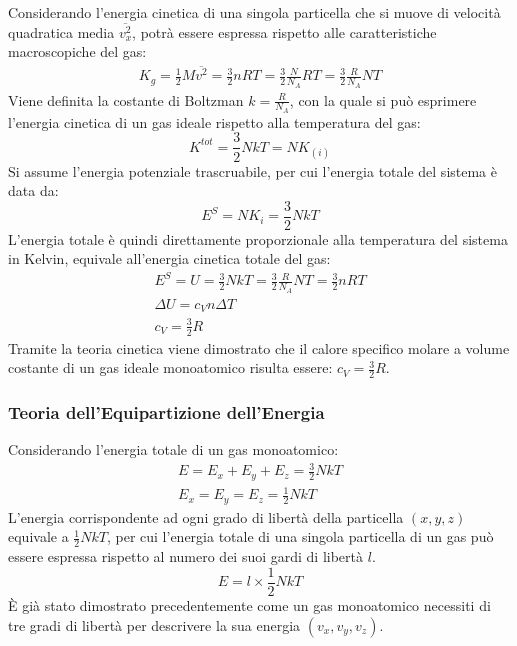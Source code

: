 \documentclass{article}
\numberwithin{equation}{subsection}
\begin{document}
Considerando l'energia cinetica di una singola particella che si muove di velocità quadratica media $\overline{v_x^2}$, potrà essere espressa rispetto alle caratteristiche 
macroscopiche del gas: 
\begin{gather*}
    K_g=\displaystyle\frac{1}{2}M\overline {v^2}=\frac{3}{2}nRT=\frac{3}{2}\frac{N}{N_A}RT=\frac{3}{2}\frac{R}{N_A}NT
\end{gather*}
Viene definita la costante di Boltzman $k=\displaystyle\frac{R}{N_A}$, 
con la quale si può esprimere l'energia cinetica di un gas ideale 
rispetto alla temperatura del gas:
\begin{equation*}
    K^{tot}=\displaystyle\frac{3}{2}NkT=NK_{(i)}
\end{equation*}
Si assume l'energia potenziale trascruabile, per cui 
l'energia totale del sistema è data da:
\begin{equation}
    E^S=NK_i=\displaystyle\frac{3}{2}NkT
\end{equation}
L'energia totale è quindi direttamente proporzionale alla 
temperatura del sistema in Kelvin, equivale all'energia cinetica totale del gas: 
\begin{gather*}
    E^S= U=\displaystyle\frac{3}{2}NkT=\frac{3}{2}\frac{R}{N_A}NT=\frac{3}{2}nRT\\
    \Delta U=c_Vn\Delta T\\
    c_V=\displaystyle\frac{3}{2}R
\end{gather*}
Tramite la teoria cinetica viene dimostrato che il calore 
specifico molare a volume costante di un gas ideale 
monoatomico risulta essere: $c_V=\displaystyle\frac{3}{2}R$.

\subsubsection{Teoria dell'Equipartizione dell'Energia}


Considerando l'energia totale di un gas monoatomico:
\begin{gather*}
    E=E_x+E_y+E_z=\displaystyle\frac{3}{2}NkT\\
    E_x=E_y=E_z=\displaystyle\frac{1}{2}NkT
\end{gather*}
L'energia corrispondente ad ogni grado di libertà della particella $(x,y,z)$ equivale a $\displaystyle\frac{1}{2}NkT$, per cui l'energia totale di una singola particella di un 
gas può essere espressa rispetto al numero dei suoi gardi di libertà $l$. 
\begin{equation*}
    E=l\times\frac{1}{2}NkT
\end{equation*} 
\`{E} già stato dimostrato precedentemente come un gas monoatomico necessiti di tre gradi di libertà per descrivere la sua energia $(v_x,v_y,v_z)$.  
\end{document}

